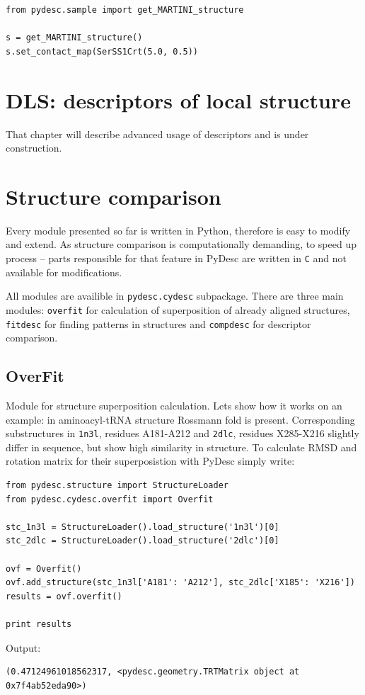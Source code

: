 \documentclass{article}
\begin{document}
\begin{lstlisting}
from pydesc.sample import get_MARTINI_structure

s = get_MARTINI_structure()
s.set_contact_map(SerSS1Crt(5.0, 0.5))
\end{lstlisting}


\section{DLS: descriptors of local structure} \label{PyDLSsec}

That chapter will describe advanced usage of descriptors and is under construction.



\section{Structure comparison} \label{CyDESCsec}

Every module presented so far is written in Python, therefore is easy to modify and extend. As structure comparison is computationally demanding, to speed up process -- parts responsible for that feature in PyDesc are written in \texttt{C} and not available for modifications.

All modules are availible in \texttt{pydesc.cydesc} subpackage. There are three main modules: \texttt{overfit} for calculation of superposition of already aligned structures, \texttt{fitdesc} for finding patterns in structures and \texttt{compdesc} for descriptor comparison.

%
%
\subsection{OverFit}

Module for structure superposition calculation.
Lets show how it works on an example: in aminoacyl-tRNA structure Rossmann fold is present.
Corresponding substructures in \texttt{1n3l}, residues A181-A212 and \texttt{2dlc}, residues X285-X216 slightly differ in sequence, but show high similarity in structure. To calculate RMSD and rotation matrix for their superposistion with PyDesc simply write:

\begin{lstlisting}
from pydesc.structure import StructureLoader
from pydesc.cydesc.overfit import Overfit

stc_1n3l = StructureLoader().load_structure('1n3l')[0]
stc_2dlc = StructureLoader().load_structure('2dlc')[0]

ovf = Overfit()
ovf.add_structure(stc_1n3l['A181': 'A212'], stc_2dlc['X185': 'X216'])
results = ovf.overfit()

print results
\end{lstlisting}
Output:
\begin{lstlisting}
(0.47124961018562317, <pydesc.geometry.TRTMatrix object at 0x7f4ab52eda90>)
\end{lstlisting}
\end{document}
